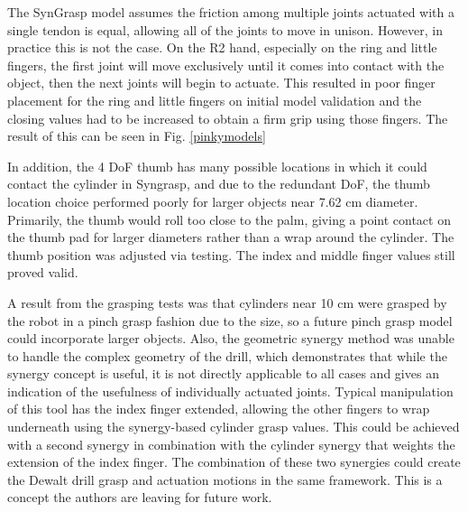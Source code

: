 \documentclass[runningheads,a4paper]{llncs}
\begin{document}
The SynGrasp model assumes the friction among multiple joints actuated with a single tendon is equal, allowing all of the joints to move in unison. However, in practice this is not the case. On the R2 hand, especially on the ring and little fingers, the first joint will move exclusively until it comes into contact with the object, then the next joints will begin to actuate. This resulted in poor finger placement for the ring and little fingers on initial model validation and the closing values had to be increased to obtain a firm grip using those fingers. The result of this can be seen in Fig. \ref{pinkymodels}

In addition, the 4 DoF thumb has many possible locations in which it could contact the cylinder in Syngrasp, and due to the redundant DoF, the thumb location choice performed poorly for larger objects near 7.62 cm diameter. Primarily, the thumb would roll too close to the palm, giving a point contact on the thumb pad for larger diameters rather than a wrap around the cylinder. The thumb position was adjusted via testing. The index and middle finger values still proved valid. 

A result from the grasping tests was that cylinders near 10 cm were grasped by the robot in a pinch grasp fashion due to the size, so a future pinch grasp model could incorporate larger objects. Also, the geometric synergy method was unable to handle the complex geometry of the drill, which demonstrates that while the synergy concept is useful, it is not directly applicable to all cases and gives an indication of the usefulness of individually actuated joints. Typical manipulation of this tool has the index finger extended, allowing the other fingers to wrap underneath using the synergy-based cylinder grasp values. This could be achieved with a second synergy in combination with the cylinder synergy that weights the extension of the index finger. The combination of these two synergies could create the Dewalt drill grasp and actuation motions in the same framework. This is a concept the authors are leaving for future work. 


\end{document}
